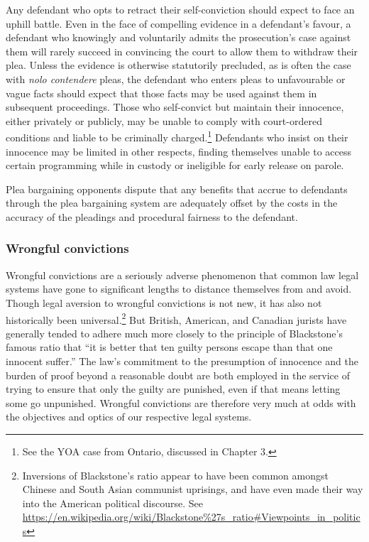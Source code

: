 Any defendant who opts to retract their self-conviction should expect to face an uphill battle. Even in the face of compelling evidence in a defendant's favour, a defendant who knowingly and voluntarily admits the prosecution's case against them will rarely succeed in convincing the court to allow them to withdraw their plea. Unless the evidence is otherwise statutorily precluded, as is often the case with \textit{nolo contendere} pleas, the defendant who enters pleas to unfavourable or vague facts should expect that those facts may be used against them in subsequent proceedings. Those who self-convict but maintain their innocence, either privately or publicly, may be unable to comply with court-ordered conditions and liable to be criminally charged.\footnote{See the YOA case from Ontario, discussed in Chapter 3.} Defendants who insist on their innocence may be limited in other respects, finding themselves unable to access certain programming while in custody or ineligible for early release on parole. 

Plea bargaining opponents dispute that any benefits that accrue to defendants through the plea bargaining system are adequately offset by the costs in the accuracy of the pleadings and procedural fairness to the defendant. 

\subsubsection{Wrongful convictions}

Wrongful convictions are a seriously adverse phenomenon that common law legal systems have gone to significant lengths to distance themselves from and avoid. Though legal aversion to wrongful convictions is not new, it has also not historically been universal.\footnote{Inversions of Blackstone's ratio appear to have been common amongst Chinese and South Asian communist uprisings, and have even made their way into the American political discourse. See \url{https://en.wikipedia.org/wiki/Blackstone\%27s_ratio\#Viewpoints_in_politics}} But British, American, and Canadian jurists have generally tended to adhere much more closely to the principle of Blackstone's famous ratio that ``it is better that ten guilty persons escape than that one innocent suffer.'' The law's commitment to the presumption of innocence and the burden of proof beyond a reasonable doubt are both employed in the service of trying to ensure that only the guilty are punished, even if that means letting some go unpunished. Wrongful convictions are therefore very much at odds with the objectives and optics of our respective legal systems.


